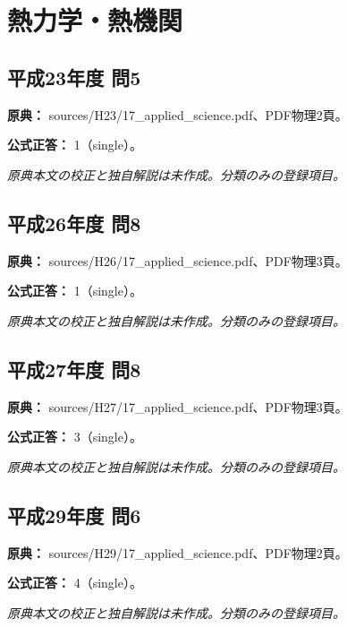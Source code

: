\section{熱力学・熱機関}

\subsection{平成23年度 問5}
\label{q:h23-reg-applied-05}

\noindent\textbf{原典：} sources/H23/17\_applied\_science.pdf、PDF物理2頁。

\textbf{公式正答：} 1（single）。

\par\textit{原典本文の校正と独自解説は未作成。分類のみの登録項目。}

\subsection{平成26年度 問8}
\label{q:h26-reg-applied-08}

\noindent\textbf{原典：} sources/H26/17\_applied\_science.pdf、PDF物理3頁。

\textbf{公式正答：} 1（single）。

\par\textit{原典本文の校正と独自解説は未作成。分類のみの登録項目。}

\subsection{平成27年度 問8}
\label{q:h27-reg-applied-08}

\noindent\textbf{原典：} sources/H27/17\_applied\_science.pdf、PDF物理3頁。

\textbf{公式正答：} 3（single）。

\par\textit{原典本文の校正と独自解説は未作成。分類のみの登録項目。}

\subsection{平成29年度 問6}
\label{q:h29-reg-applied-06}

\noindent\textbf{原典：} sources/H29/17\_applied\_science.pdf、PDF物理2頁。

\textbf{公式正答：} 4（single）。

\par\textit{原典本文の校正と独自解説は未作成。分類のみの登録項目。}

